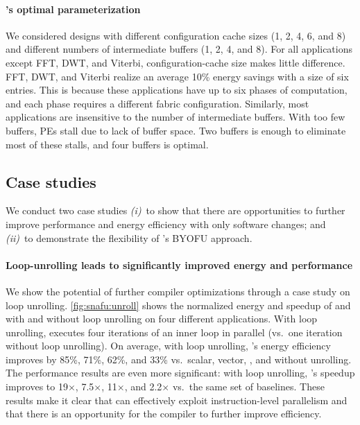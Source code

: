\paragraph{\snafu's optimal parameterization}
We considered designs with different configuration cache sizes (1, 2, 4, 6, and 8) and different numbers of intermediate buffers (1, 2, 4, and 8).
% 
For all applications except FFT, DWT, and Viterbi, configuration-cache size makes little difference.
% 
FFT, DWT, and Viterbi realize an average 10\% energy savings with a size of six entries.
% 
This is because these applications have up to six phases of computation, and each phase requires a different fabric configuration.
%
Similarly, most applications are insensitive to the number of intermediate buffers.
%
With too few buffers, PEs stall due to lack of buffer space.
%
Two buffers is enough to eliminate most of these stalls, and four buffers is optimal. 

\subsection{Case studies}
We conduct two case studies \emph{(i)}~to show that there are opportunities to further improve performance and energy efficiency with only software changes; and \emph{(ii)}~to demonstrate the flexibility of \snafuframe's BYOFU approach.

\figSNAFUScratchResults
\figSNAFUAccel %

\paragraph{Loop-unrolling leads to significantly improved energy and performance}
We show the potential of further compiler optimizations through a case study on loop unrolling.
%
\autoref{fig:snafu:unroll} shows the normalized energy and speedup of \manic and \snafuarch with and without loop unrolling on four different applications.
%
With loop unrolling, \snafuarch executes four iterations of an inner loop in parallel (vs.\ one iteration without loop unrolling).
% 
On average, with loop unrolling, \snafuarch's energy efficiency improves by 85\%, 71\%, 62\%, and 33\% vs.\ scalar, vector, \manic, and \snafuarch without unrolling.
% 
The performance results are even more significant: with loop unrolling, \snafuarch's speedup improves to 19$\times$, 7.5$\times$, 11$\times$, and 2.2$\times$ vs.\
the same set of baselines.
%
These results make it clear that \snafuarch can effectively exploit instruction-level parallelism and that there is an opportunity for the compiler to further improve efficiency.

